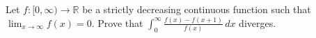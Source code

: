 Let $f:[0,\infty)\to\mathbb{R}$ be a strictly decreasing continuous function such that $\lim_{x\to\infty}f(x)=0.$ Prove that $\displaystyle\int_0^{\infty}\frac{f(x)-f(x+1)}{f(x)}\,dx$ diverges.